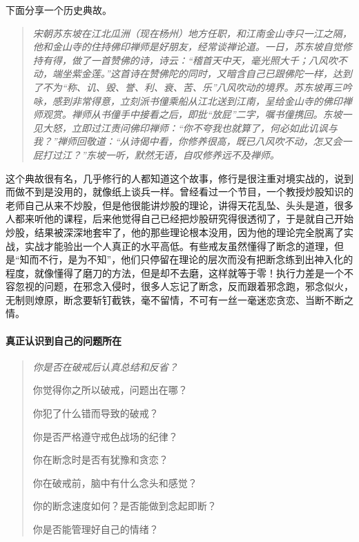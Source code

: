 下面分享一个历史典故。

\begin{quote}\it
    宋朝苏东坡在江北瓜洲（现在杨州）地方任职，和江南金山寺只一江之隔，他和金山寺的住持佛印禅师是好朋友，经常谈禅论道。一日，苏东坡自觉修持有得，做了一首赞佛的诗，诗云：“稽首天中天，毫光照大千；八风吹不动，端坐紫金莲。”这首诗在赞佛陀的同时，又暗含自己已跟佛陀一样，达到了不为“称、讥、毁、誉、利、衰、苦、乐”八风吹动的境界。苏东坡再三吟咏，感到非常得意，立刻派书僮乘船从江北送到江南，呈给金山寺的佛印禅师观赏。禅师从书僮手中接看之后，即批“放屁”二字，嘱书僮携回。东坡一见大怒，立即过江责问佛印禅师：“你不夸我也就算了，何必如此讥讽与我？”禅师回敬道：“从诗偈中看，你修养很高，既已八风吹不动，怎又会一屁打过江？”东坡一听，默然无语，自叹修养远不及禅师。
\end{quote}

这个典故很有名，几乎修行的人都知道这个故事，修行是很注重对境实战的，说到而做不到是没用的，就像纸上谈兵一样。曾经看过一个节目，一个教授炒股知识的老师自己从来不炒股，但是他很能讲炒股的理论，讲得天花乱坠、头头是道，很多人都来听他的课程，后来他觉得自己已经把炒股研究得很透彻了，于是就自己开始炒股，结果被深深地套牢了，他的那些理论根本没用，因为他的理论完全脱离了实战，实战才能验出一个人真正的水平高低。有些戒友虽然懂得了断念的道理，但是“知而不行，是为不知”，他们只停留在理论的层次而没有把断念练到出神入化的程度，就像懂得了磨刀的方法，但是却不去磨，这样就等于零！执行力差是一个不容忽视的问题，在邪念入侵时，很多人忘记了断念，反而跟着邪念跑，邪念似火，无制则燎原，断念要斩钉截铁，毫不留情，不可有一丝一毫迷恋贪恋、当断不断之情。

\paragraph{真正认识到自己的问题所在}

\begin{quotation}\it
    你是否在破戒后认真总结和反省？

    你觉得你之所以破戒，问题出在哪？

    你犯了什么错而导致的破戒？

    你是否严格遵守戒色战场的纪律？

    你在断念时是否有犹豫和贪恋？

    你在破戒前，脑中有什么念头和感觉？

    你的断念速度如何？是否能做到念起即断？

    你是否能管理好自己的情绪？
\end{quotation}

